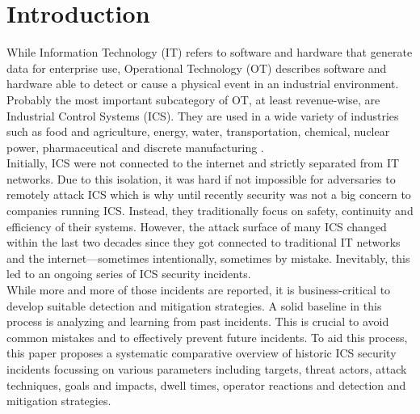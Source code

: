 \documentclass[runningheads]{llncs}
\begin{document}
\section{Introduction}
While Information Technology (IT) refers to software and hardware that generate data for enterprise use, Operational Technology (OT) describes software and hardware able to detect or cause a physical event in an industrial environment.
Probably the most important subcategory of OT, at least revenue-wise, are Industrial Control Systems (ICS).
They are used in a wide variety of industries such as food and agriculture, energy, water, transportation, chemical, nuclear power, pharmaceutical and discrete manufacturing \cite{stouffer.2011}.\\
Initially, ICS were not connected to the internet and strictly separated from IT networks.
Due to this isolation, it was hard if not impossible for adversaries to remotely attack ICS which is why until recently security was not a big concern to companies running ICS.
Instead, they traditionally focus on safety, continuity and efficiency of their systems.
However, the attack surface of many ICS changed within the last two decades since they got connected to traditional IT networks and the internet---sometimes intentionally, sometimes by mistake.
Inevitably, this led to an ongoing series of ICS security incidents.\\
While more and more of those incidents are reported, it is business-critical to develop suitable detection and mitigation strategies.
A solid baseline in this process is analyzing and learning from past incidents.
This is crucial to avoid common mistakes and to effectively prevent future incidents.
To aid this process, this paper proposes a systematic comparative overview of historic ICS security incidents focussing on various parameters including targets, threat actors, attack techniques, goals and impacts, dwell times, operator reactions and detection and mitigation strategies.
\end{document}
